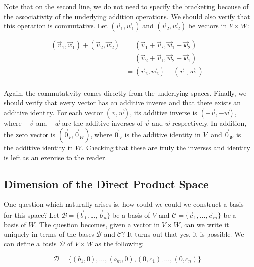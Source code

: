 \documentclass[12pt, titlepage]{article}
\begin{document}
Note that on the second line, we do not need to specify the bracketing because
of the associativity of the underlying addition operations. We should also
verify that this operation is commutative. Let $(\vec{v}_1, \vec{w}_1)$ and
$(\vec{v}_2, \vec{w}_2)$ be vectors in $V \times W$:

\begin{displaymath}
  \begin{split}
    (\vec{v}_1, \vec{w}_1) + (\vec{v}_2, \vec{w}_2)
      & = (\vec{v}_1 + \vec{v}_2, \vec{w}_1 + \vec{w}_2)  \\
      & = (\vec{v}_2 + \vec{v}_1, \vec{w}_2 + \vec{w}_1)  \\
      & = (\vec{v}_2, \vec{w}_2) + (\vec{v}_1, \vec{w}_1) \\
  \end{split}
\end{displaymath}

Again, the commutativity comes directly from the underlying spaces. Finally, we
should verify that every vector has an additive inverse and that there exists
an additive identity. For each vector $(\vec{v}, \vec{w})$, its additive
inverse is $(-\vec{v}, -\vec{w})$, where $-\vec{v}$ and $-\vec{w}$ are the
additive inverses of $\vec{v}$ and $\vec{w}$ respectively. In addition, the
zero vector is $(\vec{0}_V, \vec{0}_W)$, where $\vec{0}_V$ is the additive
identity in $V$, and $\vec{0}_W$ is the additive identity in $W$. Checking that
these are truly the inverses and identity is left as an exercise to the reader.


\subsection{Dimension of the Direct Product Space}

One question which naturally arises is, how could we could we construct a basis
for this space? Let $\mathcal{B} = \{\vec{b}_1, \dots, \vec{b}_n\}$ be a basis
of $V$ and $\mathcal{C} = \{\vec{c}_1, \dots, \vec{c}_m\}$ be a basis of $W$.
The question becomes, given a vector in $V \times W$, can we write it uniquely
in terms of the bases $\mathcal{B}$ and $\mathcal{C}$? It turns out that yes,
it is possible. We can define a basis $\mathcal{D}$ of $V \times W$ as the
following:

\begin{displaymath}
  \mathcal{D} = \{(b_1, 0), \dots, (b_m, 0), (0, c_1), \dots, (0, c_n)\}
\end{displaymath}
\end{document}
